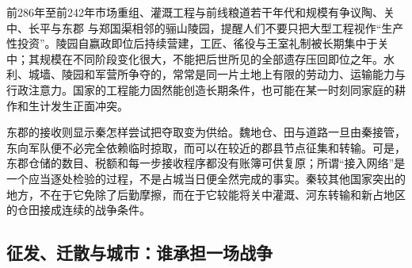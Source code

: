 \begin{event}{前286年至前242年}{市场重组、灌溉工程与前线粮道}{若干年代和规模有争议}{陶、关中、长平与东郡}
与郑国渠相邻的骊山陵园，提醒人们不要只把大型工程视作“生产性投资”。陵园自嬴政即位后持续营建，工匠、徭役与王室礼制被长期集中于关中；其规模在不同阶段变化很大，不能把后世所见的全部遗存压回即位之年。水利、城墙、陵园和军营所争夺的，常常是同一片土地上有限的劳动力、运输能力与行政注意力。国家的工程能力固然能创造长期条件，也可能在某一时刻同家庭的耕作和生计发生正面冲突。

东郡的接收则显示秦怎样尝试把夺取变为供给。魏地仓、田与道路一旦由秦接管，东向军队便不必完全依赖临时掠取，而可以在较近的郡县节点征集和转输。可是，东郡仓储的数目、税额和每一步接收程序都没有账簿可供复原；所谓“接入网络”是一个应当逐处检验的过程，不是占城当日便全然完成的事实。秦较其他国家突出的地方，不在于它免除了后勤摩擦，而在于它较能将关中灌溉、河东转输和新占地区的仓田接成连续的战争条件。
\end{event}

\subsection{征发、迁散与城市：谁承担一场战争}

